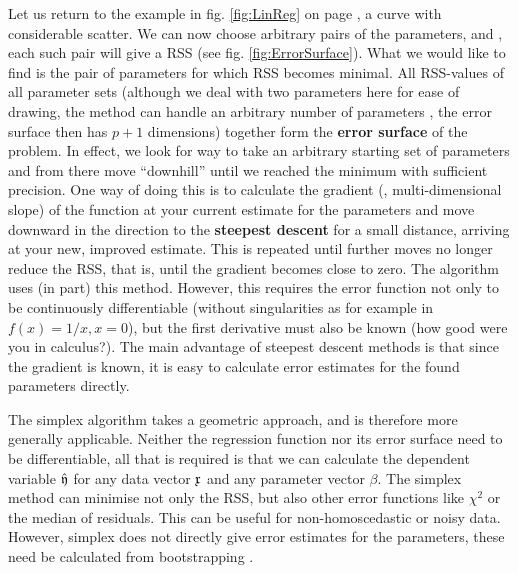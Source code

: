\begin{refsection}
Let us return to the example in fig. \ref{fig:LinReg} on page \pageref{fig:LinReg}, a  curve with considerable scatter. We can now choose arbitrary pairs of the parameters,  and , each such pair will give a \acf{RSS} (see fig. \ref{fig:ErrorSurface}). What we would like to find is the pair of parameters for which \acs{RSS} becomes minimal. All \acs{RSS}-values of all parameter sets (although we deal with two parameters here for ease of drawing, the method can handle an arbitrary number of parameters , the error surface then has \(p+1 \) dimensions) together form the \textbf{error surface} of the problem. In effect, we look for way to take an arbitrary starting set of parameters and from there move ``downhill'' until we reached the minimum with sufficient precision. One way of doing this is to calculate the gradient (\skalar{\nabla},  multi-dimensional slope) of the function at your current estimate for the parameters and move downward in the direction to the \textbf{steepest descent} for a small distance, arriving at your new, improved estimate. This is repeated until further moves no longer reduce the \acs{RSS}, that is, until the gradient becomes close to zero. The  \parencite{Lev-44,Mar-63} algorithm uses (in part) this method. However, this requires the error function not only to be continuously differentiable (without singularities as for example in \(f(x) = 1/x, x = 0 \)), but the first derivative must also be known (how good were you in calculus?). The main advantage of steepest descent methods is that since the gradient is known, it is easy to calculate error estimates for the found parameters directly.

The simplex algorithm \parencite{Nel-65,Cac-84,Kim-97} takes a geometric approach, and is therefore more generally applicable. Neither the regression function nor its error surface need to be differentiable, all that is required is that we can calculate the dependent variable \(\hat{\mathfrak{y}} \) for any data vector \(\mathfrak{x} \) and any parameter vector \(\beta \). The simplex method can minimise not only the \acs{RSS}, but also other error functions like \(\chi^2 \) or the median of residuals. This can be useful for non-homoscedastic or noisy data. However, simplex does not directly give error estimates for the parameters, these need be calculated from bootstrapping \parencite{Str-92,Str-10}.


\end{refsection}
